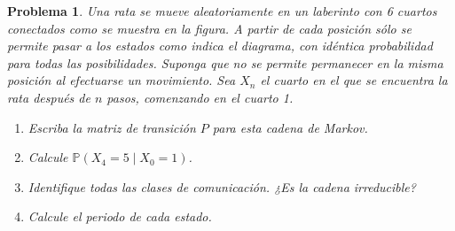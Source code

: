\documentclass[12pt]{article}
\newtheorem{problem}{Problema}
\begin{document}
\begin{problem}
Una rata se mueve aleatoriamente en un laberinto con 6 cuartos conectados como se muestra en la figura. A partir de cada posición sólo se permite pasar a los estados como indica el diagrama, con idéntica probabilidad para todas las posibilidades. 
Suponga que no se permite permanecer en la misma posición al efectuarse un movimiento.
Sea $X_n$ el cuarto en el que se encuentra la rata después de $n$ pasos, comenzando en el cuarto 1.

\begin{center}
\end{center}

\begin{enumerate}
    \item[(a)] Escriba la matriz de transición $P$ para esta cadena de Markov.
    
    \item[(b)] Calcule $\mathbb{P}(X_4 = 5 \mid X_0 = 1)$.
    
    \item[(c)] Identifique todas las clases de comunicación. ¿Es la cadena irreducible?
    
    \item[(d)] Calcule el periodo de cada estado.
    
\end{enumerate}
\end{problem}
\end{document}
